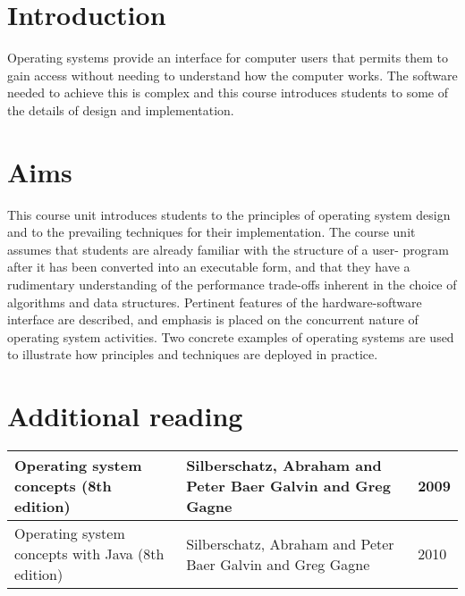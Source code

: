 \section*{Introduction}

Operating systems provide an interface for computer users that permits them to
gain access without needing to understand how the computer works. The software
needed to achieve this is complex and this course introduces students to some of
the details of design and implementation.

\section*{Aims}

This course unit introduces students to the principles of operating system
design and to the prevailing techniques for their implementation. The course
unit assumes that students are already familiar with the structure of a user-
program after it has been converted into an executable form, and that they have
a rudimentary understanding of the performance trade-offs inherent in the choice
of algorithms and data structures. Pertinent features of the hardware-software
interface are described, and emphasis is placed on the concurrent nature of
operating system activities. Two concrete examples of operating systems are used
to illustrate how principles and techniques are deployed in practice.

\section*{Additional reading}

\begin{tabularx}{\textwidth}{X|X|l}
  Operating system concepts (8th edition) & Silberschatz, Abraham and Peter Baer Galvin and Greg Gagne & 2009\\ \hline
  Operating system concepts with Java (8th edition) & Silberschatz, Abraham and Peter Baer Galvin and Greg Gagne & 2010
\end{tabularx}